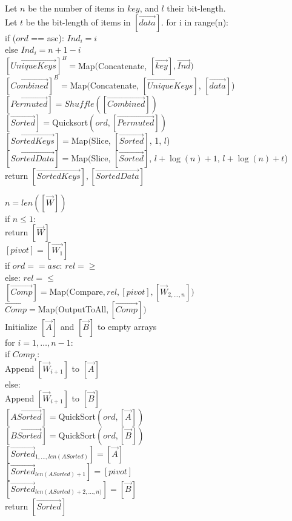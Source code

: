 \begin{protocol}
	Let $n$ be the number of items in $key$, and $l$ their bit-length.\\
	Let $t$ be the bit-length of items in $[\vec{data}]$.
	for i in range(n): \\
		if ($ord$ == asc): $Ind_i = i$ \\
		else $Ind_i = n+1-i$ \\
	$[\vec{UniqueKeys}]^B = $Map$($Concatenate, $[\vec{key}], \vec{Ind})$ \\
	$[\vec{Combined}]^B = $Map$($Concatenate, $[\vec{UniqueKeys}]$, $[\vec{data}]$) \\
	$[\vec{Permuted}] = Shuffle([\vec{Combined}])$ \\
	$[\vec{Sorted}] = $Quicksort$(ord, [\vec{Permuted}])$ \\
	$[\vec{SortedKeys}] = $Map$($Slice, $[\vec{Sorted}]$, 1, $l$) \\
	$[\vec{SortedData}] = $Map$($Slice, $[\vec{Sorted}]$, $l+\log(n)+1$, $l+\log(n)+t$) \\
	return $[\vec{SortedKeys}], [\vec{SortedData}]$ \\
\end{protocol}

\begin{protocol}
	$n = len([\vec{W}])$ \\
	if $n \leq 1$: \\
	\indent return $[\vec{W}]$ \\
	$[pivot] = [\vec{W_1}]$ \\
	if $ord == asc$: $rel = \geq$ \\
	else: $rel = \leq$ \\
	$[\vec{Comp}] = $Map$($Compare$,rel, [pivot], [\vec{W}_{2, \ldots, n}])$ \\
	$\vec{Comp} = $Map$($OutputToAll$, [\vec{Comp}])$ \\
	Initialize $[\vec{A}]$ and $[\vec{B}]$ to empty arrays \\
	for $i = 1, \ldots, n-1$: \\
	\indent if $Comp_i$: \\
	\indent \indent Append $[\vec{W}_{i+1}]$ to $[\vec{A}]$ \\
	\indent else: \\
	\indent \indent Append $[\vec{W}_{i+1}]$ to $[\vec{B}]$ \\
	$[\vec{ASorted}] = $QuickSort$(ord, [\vec{A}])$ \\
	$[\vec{BSorted}] = $QuickSort$(ord, [\vec{B}])$ \\
	$[\vec{Sorted}_{1, \ldots, len(ASorted)}] = [\vec{A}]$ \\
	$[\vec{Sorted}_{len(ASorted) + 1}] = [pivot]$ \\
	$[\vec{Sorted}_{len(ASorted) + 2, \ldots, n)}] = [\vec{B}]$ \\
	return $[\vec{Sorted}]$ \\
\end{protocol}


